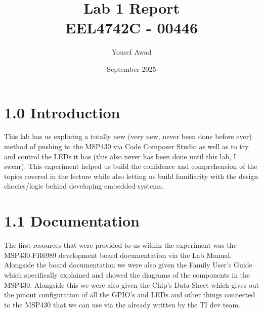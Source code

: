 \documentclass{article}
\title{Lab 1 Report \\ \large EEL4742C - 00446}
\author{Yousef Awad}
\date{September 2025}
\begin{document}
\maketitle
\tableofcontents
\newpage

\section{1.0 Introduction}
This lab has us exploring a totally new (very new, never been done before ever) method of pushing to the MSP430 via Code Composer Studio as well as to try and control the LEDs it has (this also never has been done until this lab, I swear).
\newline
This experiment helped us build the confidence and comprehension of the topics covered in the lecture while also letting us build familiarity with the design chocies/logic behind developing embedded systems.

\section{1.1 Documentation}
The first resources that were provided to us within the experiment was the MSP430-FR6989 development board documentation via the Lab Manual. 
\newline
Alongside the board documentation we were also given the Family User's Guide which specifically explained and showed the diagrams of the components in the MSP430. Alongside this we were also given the Chip's Data Sheet which gives out the pinout configuration of all the GPIO's and LEDs and other things connected to the MSP430 that we can use via the already written by the TI dev team.
\end{document}
